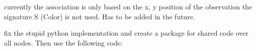 
\begin{DoxyRefList}
\item[Member \mbox{\hyperlink{classekf__localization_1_1Ekf_a2bc75da93cad880cf52ccb3f8e69c84b}{ekf\+\_\+localization\+::Ekf\+::data\+\_\+association}} (Eigen\+::\+Vector3d observation)]\label{todo__todo000001}%
%
currently the association is only based on the x, y position of the observation the signature S (Color) is not used. Has to be added in the future.  
\item[Member \mbox{\hyperlink{classEkfROSWrapper_af3ba9a2abadedde769dcfe652672b227}{Ekf\+ROSWrapper\+::Ekf\+ROSWrapper}} ()]\label{todo__todo000002}%
%
fix the stupid python implementation and create a package for shared code over all nodes. Then use the following code\+: 
\end{DoxyRefList}